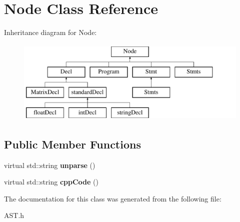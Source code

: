 \hypertarget{classNode}{\section{Node Class Reference}
\label{classNode}
}
Inheritance diagram for Node\-:\begin{figure}[H]
\begin{center}
\leavevmode
\includegraphics[height=4.000000cm]{classNode}
\end{center}
\end{figure}
\subsection*{Public Member Functions}
\begin{DoxyCompactItemize}
\item 
\hypertarget{classNode_aeb327c708aa4acd82d0f11a9620f0ae8}{virtual std\-::string {\bfseries unparse} ()}\label{classNode_aeb327c708aa4acd82d0f11a9620f0ae8}

\item 
\hypertarget{classNode_ab9dc8a0791d329231bc8427a7d7e9c2f}{virtual std\-::string {\bfseries cpp\-Code} ()}\label{classNode_ab9dc8a0791d329231bc8427a7d7e9c2f}

\end{DoxyCompactItemize}


The documentation for this class was generated from the following file\-:\begin{DoxyCompactItemize}
\item 
A\-S\-T.\-h\end{DoxyCompactItemize}
